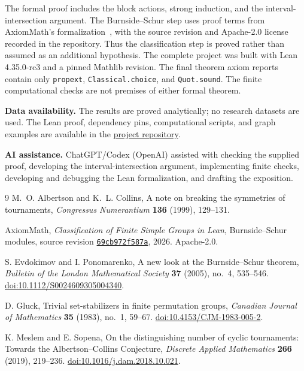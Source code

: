 \documentclass[11pt]{article}
\begin{document}
The formal proof includes the block actions, strong induction, and the
interval-intersection argument. The Burnside--Schur step uses proof
terms from AxiomMath's formalization~\cite{AxiomMath}, with the source
revision and Apache-2.0 license recorded in the repository. Thus the
classification step is proved rather than assumed as an additional
hypothesis. The complete project was built with Lean 4.35.0-rc3 and
a pinned Mathlib revision. The final theorem axiom reports contain
only \texttt{propext}, \texttt{Classical.choice}, and
\texttt{Quot.sound}. The finite computational checks are not premises
of either formal theorem.

\medskip
\noindent\textbf{Data availability.} The results are proved analytically;
no research datasets are used. The Lean proof, dependency pins,
computational scripts, and graph examples are available in the
\href{https://github.com/alexgocardinal/albertson-collins}{project repository}.

\medskip
\noindent\textbf{AI assistance.} ChatGPT/Codex (OpenAI) assisted with
checking the supplied proof, developing the interval-intersection
argument, implementing finite checks, developing and debugging the
Lean formalization, and drafting the exposition.

\begin{thebibliography}{9}
M.~O. Albertson and K.~L. Collins,
A note on breaking the symmetries of tournaments,
\emph{Congressus Numerantium} \textbf{136} (1999), 129--131.

AxiomMath,
\emph{Classification of Finite Simple Groups in Lean},
Burnside--Schur modules, source revision
\href{https://github.com/AxiomMath/CFSG/tree/69cb972f587a3ecc035e092253167ff2e303c962/CFSG/Permutation/BurnsideSchur}{\texttt{69cb972f587a}},
2026. Apache-2.0.

S. Evdokimov and I. Ponomarenko,
A new look at the Burnside--Schur theorem,
\emph{Bulletin of the London Mathematical Society}
\textbf{37} (2005), no.~4, 535--546.
\href{https://doi.org/10.1112/S0024609305004340}{doi:10.1112/S0024609305004340}.

D. Gluck,
Trivial set-stabilizers in finite permutation groups,
\emph{Canadian Journal of Mathematics} \textbf{35} (1983), no.~1, 59--67.
\href{https://doi.org/10.4153/CJM-1983-005-2}{doi:10.4153/CJM-1983-005-2}.

K. Meslem and E. Sopena,
On the distinguishing number of cyclic tournaments: \mbox{Towards} the
Albertson--Collins Conjecture,
\emph{Discrete Applied Mathematics} \textbf{266} (2019), 219--236.
\href{https://doi.org/10.1016/j.dam.2018.10.021}{doi:10.1016/j.dam.2018.10.021}.
\end{thebibliography}
\end{document}
